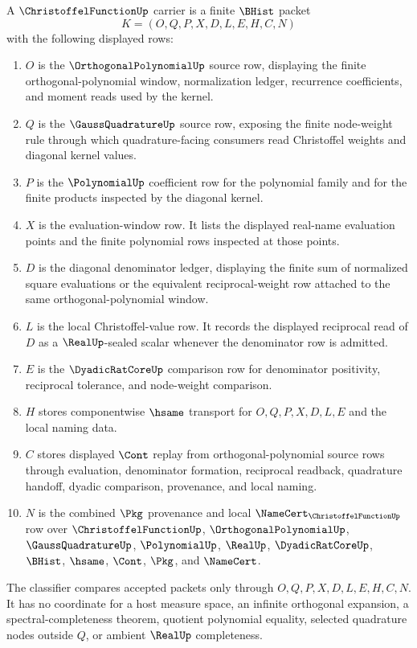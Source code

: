 \begin{definition}
\label{def:christoffel-function-carrier}
A $\ChristoffelFunctionUp$ carrier is a finite $\BHist$ packet
$$
K=(O,Q,P,X,D,L,E,H,C,N)
$$
with the following displayed rows:
\begin{enumerate}
\item $O$ is the $\OrthogonalPolynomialUp$ source row, displaying the finite orthogonal-polynomial window, normalization ledger, recurrence coefficients, and moment reads used by the kernel.
\item $Q$ is the $\GaussQuadratureUp$ source row, exposing the finite node-weight rule through which quadrature-facing consumers read Christoffel weights and diagonal kernel values.
\item $P$ is the $\PolynomialUp$ coefficient row for the polynomial family and for the finite products inspected by the diagonal kernel.
\item $X$ is the evaluation-window row. It lists the displayed real-name evaluation points and the finite polynomial rows inspected at those points.
\item $D$ is the diagonal denominator ledger, displaying the finite sum of normalized square evaluations or the equivalent reciprocal-weight row attached to the same orthogonal-polynomial window.
\item $L$ is the local Christoffel-value row. It records the displayed reciprocal read of $D$ as a $\RealUp$-sealed scalar whenever the denominator row is admitted.
\item $E$ is the $\DyadicRatCoreUp$ comparison row for denominator positivity, reciprocal tolerance, and node-weight comparison.
\item $H$ stores componentwise $\hsame$ transport for $O,Q,P,X,D,L,E$ and the local naming data.
\item $C$ stores displayed $\Cont$ replay from orthogonal-polynomial source rows through evaluation, denominator formation, reciprocal readback, quadrature handoff, dyadic comparison, provenance, and local naming.
\item $N$ is the combined $\Pkg$ provenance and local $\NameCert_{\ChristoffelFunctionUp}$ row over $\ChristoffelFunctionUp$, $\OrthogonalPolynomialUp$, $\GaussQuadratureUp$, $\PolynomialUp$, $\RealUp$, $\DyadicRatCoreUp$, $\BHist$, $\hsame$, $\Cont$, $\Pkg$, and $\NameCert$.
\end{enumerate}
The classifier compares accepted packets only through $O,Q,P,X,D,L,E,H,C,N$. It has no coordinate for a host measure space, an infinite orthogonal expansion, a spectral-completeness theorem, quotient polynomial equality, selected quadrature nodes outside $Q$, or ambient $\RealUp$ completeness.
\end{definition}

